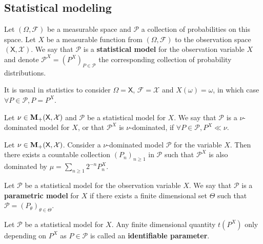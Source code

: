 \subsection{Statistical modeling}

	\begin{defn}
		Let $(\Omega,\mathcal{F})$ be a measurable space and $\mathcal{P}$ a collection of probabilities on this space.
		Let $X$ be a measurable function from $(\Omega,\mathcal{F})$ to the observation space $(\mathsf{X},\mathcal{X})$.
		We say that $\mathcal{P}$ is a \textbf{statistical model} for the observation variable $X$ and denote $\mathcal{P}^X = \left( P^X \right)_{P \in \mathcal{P}}$ the corresponding collection of probability distributions.
	\end{defn}

	It is usual in statistics to consider $\Omega = \mathsf{X}$, $\mathcal{F} = \mathcal{X}$ and $X(\omega) = \omega$, in which case $\forall P \in \mathcal{P}, P = P^X$.

	\begin{defn}
		Let $\nu \in \mathbf{M}_+(\mathsf{X},\mathcal{X})$ and $\mathcal{P}$ be a statistical model for $X$.
		We say that $\mathcal{P}$ is a $\nu$-dominated model for $X$, or that $\mathcal{P}^X$ is $\nu$-dominated, if $\forall P \in \mathcal{P}, P^X \ll \nu$.
	\end{defn}

	\begin{lem}
		Let $\nu \in \mathbf{M}_+(\mathsf{X},\mathcal{X})$.
		Consider a $\nu$-dominated model $\mathcal{P}$ for the variable $X$.
		Then there exists a countable collection $(P_n)_{n \geq 1}$ in $\mathcal{P}$ such that $\mathcal{P}^X$ is also dominated by $\mu = \sum_{n \geq 1} 2^{-n} P_n^X$.
	\end{lem}

	\begin{defn}
		Let $\mathcal{P}$ be a statistical model for the observation variable $X$.
		We say that $\mathcal{P}$ is a \textbf{parametric model} for $X$ if there exists a finite dimensional set $\Theta$ such that $\mathcal{P} = (P_\theta)_{\theta \in \Theta}$.
	\end{defn}

	\begin{defn}
		Let $\mathcal{P}$ be a statistical model for $X$.
		Any finite dimensional quantity $t(P^X)$ only depending on $P^X$ as $P \in \mathcal{P}$ is called an \textbf{identifiable parameter}.
	\end{defn}

